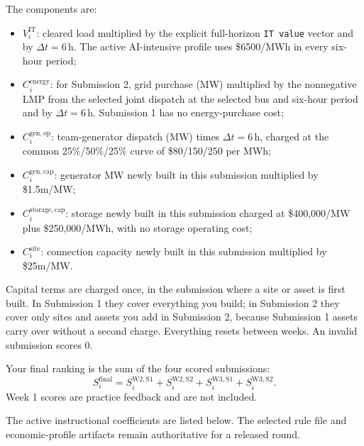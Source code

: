 \documentclass[12pt]{article}
\newcommand{\code}[1]{\texttt{#1}}
\newcommand{\USD}{\$}
\begin{document}
The components are:
\begin{itemize}[leftmargin=*]
  \item $V_i^{\mathrm{IT}}$: cleared load multiplied by the explicit full-horizon
  \code{IT value} vector and by $\Delta t=6$\,h. The active AI-intensive
  profile uses \USD6500/MWh in every six-hour period;
  \item $C_i^{\mathrm{energy}}$: for Submission 2, grid purchase (MW) multiplied by
  the nonnegative LMP from the selected joint dispatch at the selected bus and
  six-hour period and by $\Delta t=6$\,h. Submission 1 has no energy-purchase cost;
  \item $C_i^{\mathrm{gen,op}}$: team-generator dispatch (MW) times
  $\Delta t=6$\,h, charged at the common 25\%/50\%/25\% curve of
  \USD80/150/250 per MWh;
  \item $C_i^{\mathrm{gen,cap}}$: generator MW newly built in this submission
  multiplied by \USD1.5m/MW;
  \item $C_i^{\mathrm{storage,cap}}$: storage newly built in this submission
  charged at \USD400,000/MW plus \USD250,000/MWh, with no storage operating cost;
  \item $C_i^{\mathrm{site}}$: connection capacity newly built in this
  submission multiplied by \USD25m/MW.
\end{itemize}
Capital terms are charged once, in the submission where a site or asset is
first built. In Submission 1 they cover everything you build; in Submission 2
they cover only sites and assets you add in Submission 2, because Submission 1
assets carry over without a second charge. Everything resets between weeks.
An invalid submission scores 0.

Your final ranking is the sum of the four scored submissions:
\[
  S_i^{\mathrm{final}}
  = S_i^{\mathrm{W2,S1}} + S_i^{\mathrm{W2,S2}}
  + S_i^{\mathrm{W3,S1}} + S_i^{\mathrm{W3,S2}}.
\]
Week 1 scores are practice feedback and are not included.

The active instructional coefficients are listed below. The selected rule file
and economic-profile artifacts remain authoritative for a released round.
\end{document}
